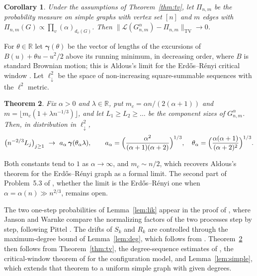 \documentclass[11pt]{amsart}
\newtheorem{theorem}{Theorem}[section]
\newtheorem{corollary}[theorem]{Corollary}
\theoremstyle{remark}
\numberwithin{equation}{section}
\newcommand{\TV}{\mathrm{TV}}
\newcommand{\ldown}{\ell^2_{\downarrow}}
\begin{document}
\begin{corollary}\label{cor:static}
Under the assumptions of Theorem~\ref{thm:tv}, let $\Pi_{n,m}$ be the probability measure on simple graphs with vertex set $[n]$ and $m$ edges with $\Pi_{n,m}(G)\propto\prod_{v}(\alpha)_{d_v(G)}$. Then $\|\mathcal L(G^\alpha_{n,m})-\Pi_{n,m}\|_{\TV}\to0$.
\end{corollary}

For $\theta\in\mathbb R$ let $\boldsymbol\gamma(\theta)$ be the vector of lengths of the excursions of $B(u)+\theta u-u^2/2$ above its running minimum, in decreasing order, where $B$ is standard Brownian motion; this is Aldous's limit for the Erd\H{o}s--R\'enyi critical window \cite{Al97}. Let $\ldown$ be the space of non-increasing square-summable sequences with the $\ell^2$ metric.

\begin{theorem}\label{thm:window}
Fix $\alpha>0$ and $\lambda\in\mathbb R$, put $m_c=\alpha n/(2(\alpha+1))$ and $m=\lfloor m_c(1+\lambda n^{-1/3})\rfloor$, and let $L_1\ge L_2\ge\dots$ be the component sizes of $G^\alpha_{n,m}$. Then, in distribution in $\ldown$,
\[
\bigl(n^{-2/3}L_j\bigr)_{j\ge1}\ \to\ a_\alpha\,\boldsymbol\gamma(\theta_\alpha\lambda),\qquad a_\alpha=\Bigl(\frac{\alpha^2}{(\alpha+1)(\alpha+2)}\Bigr)^{1/3},\quad \theta_\alpha=\Bigl(\frac{\alpha(\alpha+1)}{(\alpha+2)^2}\Bigr)^{1/3}.
\]
\end{theorem}

Both constants tend to $1$ as $\alpha\to\infty$, and $m_c\sim n/2$, which recovers Aldous's theorem for the Erd\H{o}s--R\'enyi graph as a formal limit. The second part of Problem~5.3 of \cite{JW21}, whether the limit is the Erd\H{o}s--R\'enyi one when $\alpha=\alpha(n)\gg n^{2/3}$, remains open.

The two one-step probabilities of Lemma~\ref{lem:lik} appear in the proof of \cite[Lemma~3.3]{JW21}, where Janson and Warnke compare the normalizing factors of the two processes step by step, following Pittel \cite[Section~3]{Pi10}. The drifts of $S_k$ and $R_k$ are controlled through the maximum-degree bound of Lemma~\ref{lem:deg}, which follows from \cite[Theorems~2.2 and~2.5]{JW21}. Theorem~\ref{thm:window} then follows from Theorem~\ref{thm:tv}, the degree-sequence estimates of \cite[Theorem~2.5]{JW21}, the critical-window theorem of \cite{DHLS17} for the configuration model, and Lemma~\ref{lem:simple}, which extends that theorem to a uniform simple graph with given degrees.
\end{document}
